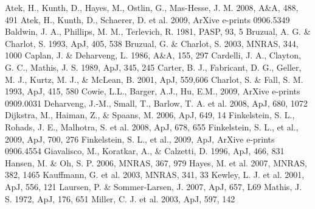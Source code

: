\documentclass[manuscript]{emulateapj}
\begin{document}
% 
% 
%
\begin{thebibliography}{32}
 Atek, H., Kunth, D., Hayes, M., Ostlin, G.,  Mas-Hesse, J. M. 2008, A\&A, 488, 491
 Atek, H., Kunth, D.,  Schaerer, D. et al. 2009, ArXive e-prints 0906.5349
 Baldwin, J. A., Phillips, M. M.,  Terlevich, R. 1981, PASP, 93, 5
 Bruzual, A. G. \& Charlot, S. 1993, ApJ, 405, 538
 Bruzual, G. \& Charlot, S. 2003, MNRAS, 344, 1000
 Caplan, J. \& Deharveng, L. 1986, A\&A, 155, 297
 Cardelli, J. A., Clayton, G. C.,  Mathis, J. S. 1989, ApJ, 345, 245
 Carter, B. J., Fabricant, D. G., Geller, M. J., Kurtz, M. J., \& McLean, B. 2001, ApJ, 559,606
 Charlot, S. \& Fall, S. M. 1993, ApJ, 415, 580
 Cowie, L.L., Barger, A.J., Hu, E.M., 2009, ArXive e-prints 0909.0031
 Deharveng, J.-M., Small, T.,  Barlow, T. A. et al. 2008, ApJ, 680, 1072
 Dijkstra, M., Haiman, Z., \& Spaans, M. 2006, ApJ, 649, 14
 Finkelstein, S. L., Rohads, J. E.,  Malhotra, S. et al. 2008, ApJ, 678, 655
 Finkelstein, S. L., et al., 2009, ApJ, 700, 276
 Finkelstein, S. L., et al., 2009, ApJ, ArXive e-prints 0906.4554
 Giavalisco, M., Koratkar, A., \& Calzetti, D. 1996, ApJ, 466, 831
 Hansen, M. \& Oh, S. P. 2006, MNRAS, 367, 979
 Hayes, M. et al. 2007, MNRAS, 382, 1465
 Kauffmann, G. et al. 2003, MNRAS, 341, 33
 Kewley, L. J. et al. 2001, ApJ, 556, 121
 Laursen, P. \& Sommer-Larsen, J. 2007, ApJ, 657, L69
 Mathis, J. S. 1972, ApJ, 176, 651
 Miller, C. J. et al. 2003, ApJ, 597, 142

\end{thebibliography}
\end{document}

